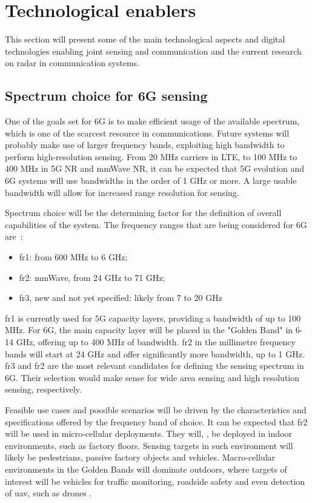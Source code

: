 \section{Technological enablers}

	This section will present some of the main technological aspects and digital technologies enabling joint sensing and communication and the current research on radar in communication systems.	
	
	\subsection{Spectrum choice for 6G sensing}

	One of the goals set for 6G is to make efficient usage of the available spectrum, which is one of the scarcest resource in communications.
	Future systems will probably make use of larger frequency bands, exploiting high bandwidth to perform high-resolution sensing. From 20 MHz carriers in LTE, to 100 MHz to 400 MHz in 5G NR and mmWave \gls{NR}, it can be expected that \gls{5G} evolution and 6G systems will use bandwidths in the order of 1 GHz or more. A large usable bandwidth will allow for increased range resolution for sensing.
	
	Spectrum choice will be the determining factor for the definition of overall capabilities of the system. The frequency ranges that are being considered for 6G are~\cite{Hexa}:
	
	\begin{itemize}
		\item \Gls{fr1}: from 600 MHz to 6 GHz;
		\item \Gls{fr2}: mmWave, from 24 GHz to 71 GHz;
		\item \gls{fr3}, new and not yet specified: likely from 7 to 20 GHz
	\end{itemize}
	
	\Gls{fr1} is currently used for \Gls{5G} capacity layers, providing a bandwidth of up to 100 MHz. For 6G, the main capacity layer will be placed in the "Golden Band" in 6-14 GHz, offering up to 400 MHz of bandwidth. \Gls{fr2} in the millimetre frequency bands will start at 24 GHz and offer significantly more bandwidth, up to 1 GHz.
	\Gls{fr3} and \Gls{fr2} are the most relevant candidates for defining the sensing spectrum in 6G. Their selection would make sense for wide area sensing and high resolution sensing, respectively.
	
	Feasible use cases and possible scenarios will be driven by the characteristics and specifications offered by the frequency band of choice. It can be expected that \Gls{fr2} will be used in micro-cellular deployments. They will, \eg, be deployed in indoor environments, such as factory floors. Sensing targets in such environment will likely be pedestrians, passive factory objects and vehicles.
	Macro-cellular environments in the Golden Bands will dominate outdoors, where targets of interest will be vehicles for traffic monitoring, roadside safety and even detection of \gls{uav}, such as drones \cite{Mandelli_Henninger_Bauhofer_Wild_2023}.
	
